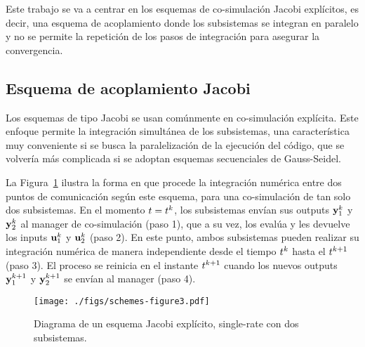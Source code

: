 Este trabajo se va a centrar en los esquemas de co-simulación Jacobi explícitos, es decir, una esquema de acoplamiento donde los subsistemas se integran en paralelo y no se permite la repetición de los pasos de integración para asegurar la convergencia. 

\subsection{Esquema de acoplamiento Jacobi}
\label{sec:Jacobi}

Los esquemas de tipo Jacobi se usan comúnmente en co-simulación explícita.
Este enfoque permite la integración simultánea de los subsistemas, una característica muy conveniente si se busca la paralelización de la ejecución del código, que se volvería más complicada si se adoptan esquemas secuenciales de Gauss-Seidel.

La Figura~\ref{fig:jacobi} ilustra la forma en que procede la integración numérica entre dos puntos de comunicación según este esquema, para una co-simulación de tan solo dos subsistemas.
En el momento $t=t^{k}$, los subsistemas envían sus outputs $\mathbf{y}_1^{k}$ y $\mathbf{y}_2^{k}$ al manager de co-simulación (paso 1), que a su vez, los evalúa y les devuelve los inputs $\mathbf{u}_1^{k}$ y $\mathbf{u}_2^{k}$ (paso 2).
En este punto, ambos subsistemas pueden realizar su integración numérica de manera independiente desde el tiempo $t^{k}$ hasta el $t^{k +1}$ (paso 3).
El proceso se reinicia en el instante $t^{k + 1}$ cuando los nuevos outputs $\mathbf{y}_1^{k + 1}$ y $\mathbf{y}_2^{k + 1}$ se envían al manager (paso 4).
\begin{figure}[ht!]\centering
	\texttt{[image: ./figs/schemes-figure3.pdf]}
	\caption{Diagrama de un esquema Jacobi explícito, single-rate con dos subsistemas.}
	\label{fig:jacobi}
\end{figure}

